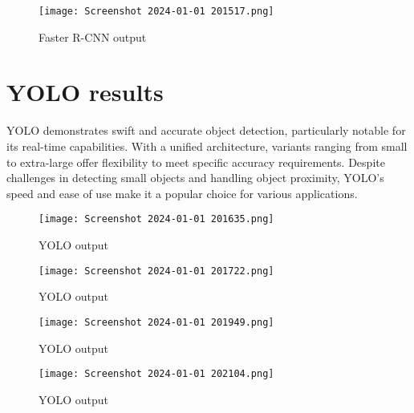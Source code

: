 \documentclass{article}
\begin{document}


\begin{figure}[H]
  \centering
  \texttt{[image: Screenshot 2024-01-01 201517.png]} %
  \caption{Faster R-CNN output}
  \label{fig:example}
\end{figure}



\section{YOLO results}

YOLO demonstrates swift and accurate object detection, particularly notable for its real-time capabilities. With a unified architecture, variants ranging from small to extra-large offer flexibility to meet specific accuracy requirements. Despite challenges in detecting small objects and handling object proximity, YOLO's speed and ease of use make it a popular choice for various applications.

\begin{figure}[H]
  \centering
  \texttt{[image: Screenshot 2024-01-01 201635.png]} %
  \caption{YOLO output}
  \label{fig:example}
\end{figure}


\begin{figure}[H]
  \centering
  \texttt{[image: Screenshot 2024-01-01 201722.png]} %
  \caption{YOLO output}
  \label{fig:example}
\end{figure}

\begin{figure}[H]
  \centering
  \texttt{[image: Screenshot 2024-01-01 201949.png]} %
  \caption{YOLO output}
  \label{fig:example}
\end{figure}


\begin{figure}[H]
  \centering
  \texttt{[image: Screenshot 2024-01-01 202104.png]} %
  \caption{YOLO output}
  \label{fig:example}
\end{figure}
\end{document}
